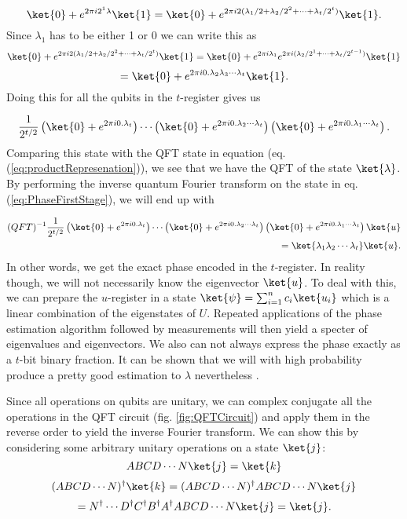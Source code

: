 $$ \ket{0} + e^{2\pi i 2^1 \lambda}\ket{1} = \ket{0} + e^{2\pi i 2(\lambda_1/2 +  \lambda_2/2^2  + \cdots + \lambda_t /2^t)}\ket{1} .$$
Since $\lambda_1$ has to be either 1 or 0 we can write this as
$$\ket{0} + e^{2\pi i 2(\lambda_1/2 +  \lambda_2/2^2  + \cdots + \lambda_t /2^t)}\ket{1} =\ket{0} + e^{2\pi i \lambda_1}e^{2\pi i (\lambda_2/2^1  + \cdots + \lambda_t /2^{t-1})}\ket{1} $$ 
$$= \ket{0} + e^{2\pi i0.\lambda_2\lambda_3\cdots\lambda_t}\ket{1} .$$
Doing this for all the qubits in the $t$-register gives us

\begin{equation}
    \label{eq:PhaseFirstStage}
    \frac{1}{2^{t/2}}  \left(  \ket{0} + e^{2\pi i 0.\lambda_t}  \right) \cdots\left(  \ket{0} + e^{2\pi i 0.\lambda_2\cdots\lambda_t}  \right)\left(  \ket{0} + e^{2\pi i 0.\lambda_1\cdots\lambda_t}  \right).
\end{equation}
Comparing this state with the QFT state in equation (eq. (\ref{eq:productRepresenation})), we see that we have the QFT of the state $\ket{\lambda}$. By performing the inverse quantum Fourier transform on the state in eq. (\ref{eq:PhaseFirstStage}), we will end up with

\begin{align}
    \label{eq:QPEFinalStep}
    (QFT)^{-1} \frac{1}{2^{t/2}}  \left(  \ket{0} + e^{2\pi i 0.\lambda_t}  \right) \cdots\left(  \ket{0} + e^{2\pi i 0.\lambda_2\cdots\lambda_t}  \right)\left(  \ket{0} + e^{2\pi i 0.\lambda_1\cdots\lambda_t}  \right)\ket{u} \notag \\ 
    = \ket{\lambda_1\lambda_2\cdots\lambda_t}\ket{u}.
\end{align}
In other words, we get the exact phase encoded in the $t$-register.
In reality though, we will not necessarily know the eigenvector $\ket{u}$. To deal with this, we can prepare the $u$-register in a state $\ket{\psi} = \sum_{i=1}^{n} c_i \ket{u_i}$ which is a linear combination of the eigenstates of $U$. Repeated applications of the phase estimation algorithm followed by measurements will then yield a specter of eigenvalues and eigenvectors. We also can not always express the phase exactly as a $t$-bit binary fraction. It can be shown that we will with high probability produce a pretty good estimation to $\lambda$ nevertheless \cite{NielsenAndChuang}.

Since all operations on qubits are unitary, we can complex conjugate all the operations in the QFT circuit (fig. \ref{fig:QFTCircuit}) and apply them in the reverse order to yield the inverse Fourier transform. We can show this by considering some arbitrary unitary operations on a state $\ket{j}$:
$$ABCD\cdots N \ket{j} = \ket{k}$$
$$(ABCD\cdots N )^{\dagger} \ket{k} = (ABCD\cdots N )^{\dagger}ABCD\cdots N \ket{j}$$
$$= N^\dagger \cdots D^\dagger C^\dagger B^\dagger A^\dagger ABCD\cdots N \ket{j} = \ket{j}.$$

